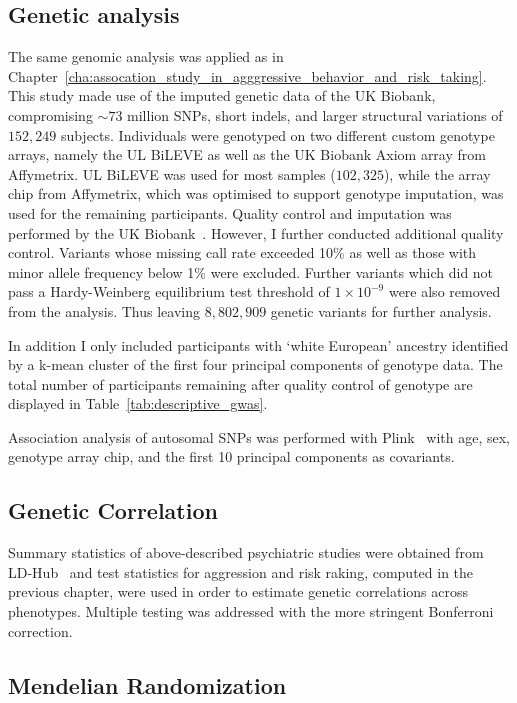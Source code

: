 \subsection{Genetic analysis}
\label{sub:genetic_analysis}

The same genomic analysis was applied as in Chapter~\ref{cha:assocation_study_in_agggressive_behavior_and_risk_taking}.
This study made use of the imputed genetic data of the UK Biobank, compromising $\sim73$ million SNPs, short indels, and larger structural variations of $152,249$ subjects.
Individuals were genotyped on two different custom genotype arrays, namely the UL BiLEVE as well as the UK Biobank Axiom array from Affymetrix. 
UL BiLEVE was used for most samples ($102,325$), while the array chip from Affymetrix, which was optimised to support genotype imputation, was used for the remaining participants. 
Quality control and imputation was performed by the UK Biobank~\cite{Marchini2015}.
However, I further conducted additional quality control.
Variants whose missing call rate exceeded 10\% as well as those with minor allele frequency below 1\% were excluded.
Further variants which did not pass a Hardy-Weinberg equilibrium test threshold of $1\times10^{-9}$ were also removed from the analysis.
Thus leaving $8,802,909$ genetic variants for further analysis.

In addition I only included participants with `white European' ancestry identified by a k-mean cluster of the first four principal components of genotype data.
The total number of participants remaining after quality control of genotype are displayed in Table~\ref{tab:descriptive_gwas}.

Association analysis of autosomal SNPs was performed with Plink~\cite{Purcell2007,Chang2015} with age, sex, genotype array chip, and the first 10 principal components as covariants.

\subsection{Genetic Correlation}
\label{sub:genetic_correlation}

Summary statistics of above-described psychiatric studies were obtained from LD-Hub~\cite{ZHENG2016} and test statistics for aggression and risk raking, computed in the previous chapter, were used in order to estimate genetic correlations across phenotypes.
Multiple testing was addressed with the more stringent Bonferroni correction.

\subsection{Mendelian Randomization}
\label{sub:joint_association_study}

